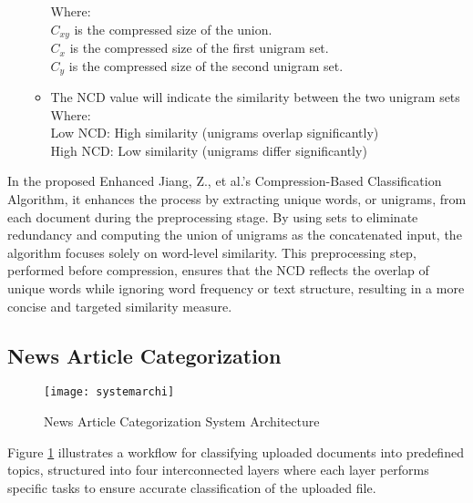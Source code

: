 \documentclass{article}
\begin{document}
\begin{enumerate}
\begin{itemize}
           Where: \\
            \(C_{xy}\) is the compressed size of the union. \\ 
            \(C_x\) is the compressed size of the first unigram set. \\
            \(C_y\) is the compressed size of the second unigram set.
        \item The NCD value will indicate the similarity between the two unigram sets \\
            Where: \\
            Low NCD: High similarity (unigrams overlap significantly) \\
            High NCD: Low similarity (unigrams differ significantly)
    \end{itemize}
\end{enumerate}

In the proposed Enhanced Jiang, Z., et al.'s Compression-Based Classification Algorithm, it enhances the process by extracting unique words, or unigrams, from each document during the preprocessing stage. By using sets to eliminate redundancy and computing the union of unigrams as the concatenated input, the algorithm focuses solely on word-level similarity. This preprocessing step, performed before compression, ensures that the NCD reflects the overlap of unique words while ignoring word frequency or text structure, resulting in a more concise and targeted similarity measure.


\subsection{News Article Categorization}

\begin{figure}[H]
    \centering
    \texttt{[image: systemarchi]}
    \caption{News Article Categorization System Architecture}
    \label{fig:systemarchi}
\end{figure}


Figure \ref{fig:systemarchi} illustrates a workflow for classifying uploaded documents into predefined topics, structured into four interconnected layers where each layer performs specific tasks to ensure accurate classification of the uploaded file.
\end{document}
